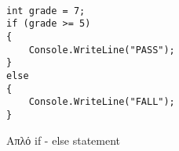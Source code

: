 \begin{listing}[htbp]
\begin{verbatim}

int grade = 7;
if (grade >= 5)
{
    Console.WriteLine("PASS");
}
else
{
    Console.WriteLine("FALL");
}
\end{verbatim}
\caption{Απλό if - else statement}
\label{flagExec}
\end{listing}